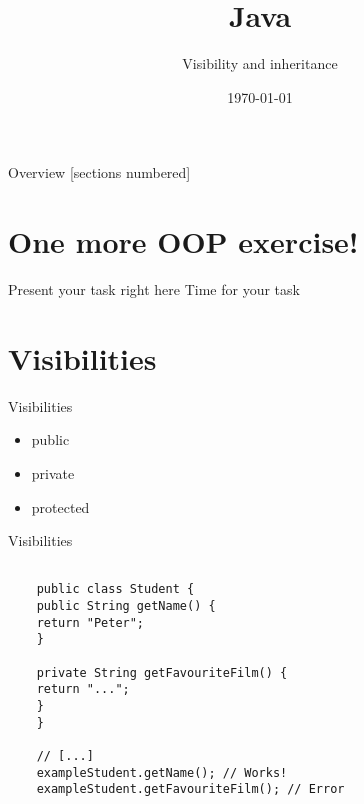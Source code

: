 

\usepackage{verbatim}

\title{Java}
\subtitle{Visibility and inheritance}
\date{\today}


	

\begin{frame}
	\titlepage
\end{frame}
\begin{frame}{Overview}
	[sections numbered]
	\tableofcontents
\end{frame}

\section{One more OOP exercise!}
\begin{frame}[fragile]{Present your task right here}
	\huge Time for your task
\end{frame}

\section{Visibilities}
\begin{frame}[fragile]{Visibilities}
	\begin{itemize}
		\item public
		\item private
		\item protected
	\end{itemize}
\end{frame}

\begin{frame}[fragile]{Visibilities}
	
	\begin{lstlisting}
	
	public class Student {
	public String getName() {
	return "Peter";
	}
	
	private String getFavouriteFilm() {
	return "...";
	}
	}
	
	// [...]
	exampleStudent.getName(); // Works!
	exampleStudent.getFavouriteFilm(); // Error
	
	\end{lstlisting}
	
\end{frame}

